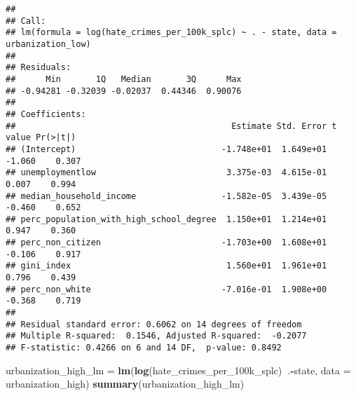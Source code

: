 \documentclass[
]{article}
\newenvironment{Shaded}{\begin{snugshade}}{\end{snugshade}}
\newcommand{\DataTypeTok}[1]{\textcolor[rgb]{0.13,0.29,0.53}{#1}}
\newcommand{\KeywordTok}[1]{\textcolor[rgb]{0.13,0.29,0.53}{\textbf{#1}}}
\newcommand{\NormalTok}[1]{#1}
\newcommand{\OperatorTok}[1]{\textcolor[rgb]{0.81,0.36,0.00}{\textbf{#1}}}
\newcommand{\StringTok}[1]{\textcolor[rgb]{0.31,0.60,0.02}{#1}}
\begin{document}
\begin{verbatim}
## 
## Call:
## lm(formula = log(hate_crimes_per_100k_splc) ~ . - state, data = urbanization_low)
## 
## Residuals:
##      Min       1Q   Median       3Q      Max 
## -0.94281 -0.32039 -0.02037  0.44346  0.90076 
## 
## Coefficients:
##                                           Estimate Std. Error t value Pr(>|t|)
## (Intercept)                             -1.748e+01  1.649e+01  -1.060    0.307
## unemploymentlow                          3.375e-03  4.615e-01   0.007    0.994
## median_household_income                 -1.582e-05  3.439e-05  -0.460    0.652
## perc_population_with_high_school_degree  1.150e+01  1.214e+01   0.947    0.360
## perc_non_citizen                        -1.703e+00  1.608e+01  -0.106    0.917
## gini_index                               1.560e+01  1.961e+01   0.796    0.439
## perc_non_white                          -7.016e-01  1.908e+00  -0.368    0.719
## 
## Residual standard error: 0.6062 on 14 degrees of freedom
## Multiple R-squared:  0.1546, Adjusted R-squared:  -0.2077 
## F-statistic: 0.4266 on 6 and 14 DF,  p-value: 0.8492
\end{verbatim}

\begin{Shaded}
\begin{Highlighting}[]
\NormalTok{urbanization_high_lm =}\StringTok{ }\KeywordTok{lm}\NormalTok{(}\KeywordTok{log}\NormalTok{(hate_crimes_per_100k_splc)}\OperatorTok{~}\NormalTok{.}\OperatorTok{-}\NormalTok{state, }\DataTypeTok{data =}\NormalTok{ urbanization_high)}
\KeywordTok{summary}\NormalTok{(urbanization_high_lm)}
\end{Highlighting}
\end{Shaded}
\end{document}

